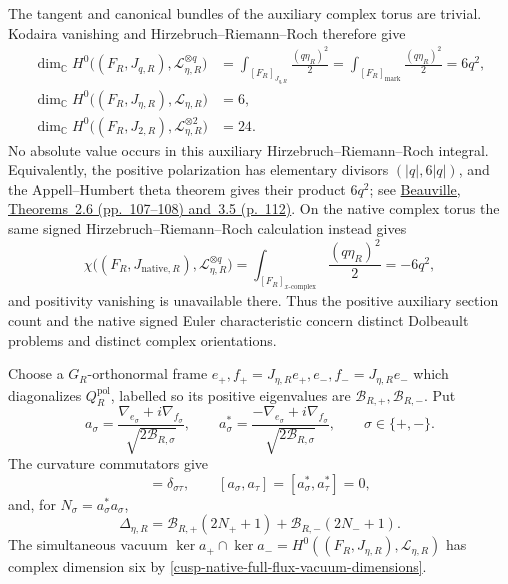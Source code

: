 The tangent and canonical bundles of the auxiliary complex torus are trivial.
Kodaira vanishing and Hirzebruch--Riemann--Roch therefore give
\begin{equation}
 \begin{aligned}
 \dim_{\mathbb C}H^0\bigl((F_R,J_{q,R}),
                   \mathscr L_{\eta,R}^{\otimes q}\bigr)
 &=\int_{[F_R]_{J_{q,R}}}\frac{(q\eta_R)^2}{2}
  =\int_{[F_R]_{\mathrm{mark}}}\frac{(q\eta_R)^2}{2}
  =6q^2,\\
 \dim_{\mathbb C}H^0\bigl((F_R,J_{\eta,R}),\mathscr L_{\eta,R}\bigr)
 &=6,\\
 \dim_{\mathbb C}H^0\bigl((F_R,J_{2,R}),
                   \mathscr L_{\eta,R}^{\otimes2}\bigr)
 &=24.
 \end{aligned}
 \label{cusp-native-full-flux-vacuum-dimensions}
\end{equation}
No absolute value occurs in this auxiliary Hirzebruch--Riemann--Roch integral.
Equivalently, the positive polarization has elementary divisors
\((|q|,6|q|)\), and the Appell--Humbert theta theorem gives their product
\(6q^2\); see
\href{https://math.univ-cotedazur.fr/~beauvill/pubs/thetaon.pdf}%
{Beauville, Theorems~2.6 (pp.~107--108) and~3.5 (p.~112)}.
On the native complex torus the same signed Hirzebruch--Riemann--Roch
calculation instead gives
\begin{equation}
 \chi\bigl((F_R,J_{\mathrm{native},R}),
           \mathscr L_{\eta,R}^{\otimes q}\bigr)
 =\int_{[F_R]_{x\text{-}\mathrm{complex}}}
       \frac{(q\eta_R)^2}{2}
 =-6q^2,
 \label{cusp-native-full-flux-native-signed-hrr}
\end{equation}
and positivity vanishing is unavailable there.  Thus the positive auxiliary
section count and the native signed Euler characteristic concern distinct
Dolbeault problems and distinct complex orientations.

Choose a \(G_R\)-orthonormal frame
\(e_+,f_+=J_{\eta,R}e_+,e_-,f_-=J_{\eta,R}e_-\) which diagonalizes
\(Q_R^{\mathrm{pol}}\), labelled so its positive eigenvalues are
\(\mathcal B_{R,+},\mathcal B_{R,-}\).  Put
\begin{equation}
 a_\sigma=
 \frac{\nabla_{e_\sigma}+i\nabla_{f_\sigma}}
      {\sqrt{2\mathcal B_{R,\sigma}}},
 \qquad
 a_\sigma^*=
 \frac{-\nabla_{e_\sigma}+i\nabla_{f_\sigma}}
      {\sqrt{2\mathcal B_{R,\sigma}}},
 \qquad \sigma\in\{+,-\}.
 \label{cusp-native-full-flux-ladders}
\end{equation}
The curvature commutators give
\begin{equation}
 [a_\sigma,a_\tau^*]=\delta_{\sigma\tau},
 \qquad [a_\sigma,a_\tau]=[a_\sigma^*,a_\tau^*]=0,
 \label{cusp-native-full-flux-CCR}
\end{equation}
and, for \(N_\sigma=a_\sigma^*a_\sigma\),
\begin{equation}
 \Delta_{\eta,R}
 =\mathcal B_{R,+}(2N_++1)+\mathcal B_{R,-}(2N_-+1).
 \label{cusp-native-full-flux-number-operator}
\end{equation}
The simultaneous vacuum
\(\ker a_+\cap\ker a_-=H^0((F_R,J_{\eta,R}),\mathscr L_{\eta,R})\)
has complex dimension six by
\cref{cusp-native-full-flux-vacuum-dimensions}.

